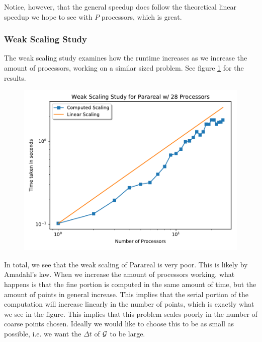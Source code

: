 Notice, however, that the general speedup does follow the theoretical linear
speedup we hope to see with $P$ processors, which is great.

\subsubsection{Weak Scaling Study}

The weak scaling study examines how the runtime increases as we increase the
amount of processors, working on a similar sized problem. See figure
\ref{fig:weak_scaling} for the results.
\begin{figure}[!htb]
  \centering
  \includegraphics[width=.8\textwidth]{./resources/weak_scaling}
  \caption{}\label{fig:weak_scaling}
\end{figure}
In total, we see that the weak scaling of Parareal is very poor. This is likely
by Amadahl's law. When we increase the amount of processors working, what
happens is that the fine portion is computed in the same amount of time, but the
amount of points in general increase. This implies that the serial portion of
the computation will increase linearly in the number of points, which is exactly
what we see in the figure. This implies that this problem scales poorly in the
number of coarse points chosen. Ideally we would like to choose this to be as
small as possible, i.e. we want the $\Delta t$ of $\mathcal{G}$ to be large.
